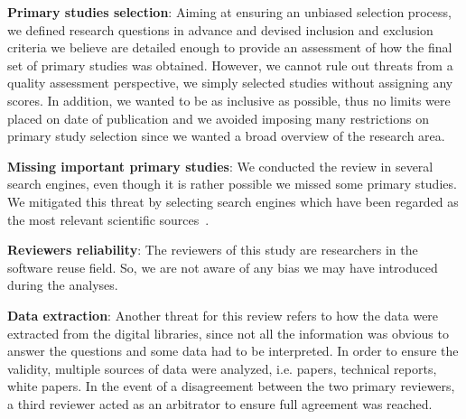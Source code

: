 
\textbf{Primary studies selection}: Aiming at ensuring an unbiased selection process, we defined research questions in advance and devised inclusion and exclusion criteria we believe are detailed enough to provide an assessment of how the final set of primary studies was obtained. However, we cannot rule out threats from a quality assessment perspective, we simply selected studies without assigning any scores. In addition, we wanted to be as inclusive as possible, thus no limits were placed on date of publication and we avoided imposing many restrictions on primary study selection since we wanted a broad overview of the research area. 

\textbf{Missing important primary studies}: We conducted the review in several search engines, even though it is rather possible we missed some primary studies. We mitigated this threat by selecting search engines which have been regarded as the most relevant scientific sources~\cite{Kitchenham}. 

\textbf{Reviewers reliability}: The reviewers of this study are researchers in the software reuse field. So, we are not aware of any bias we may have introduced during the analyses.

 \textbf{Data extraction}: Another threat for this review refers to how the data were extracted from the digital libraries, since not all the information was obvious to answer the questions and some data had to be interpreted. In order to ensure the validity, multiple sources of data were analyzed, i.e. papers, technical reports, white papers. In the event of a disagreement between the two primary reviewers, a third reviewer acted as an arbitrator to ensure full agreement was reached.